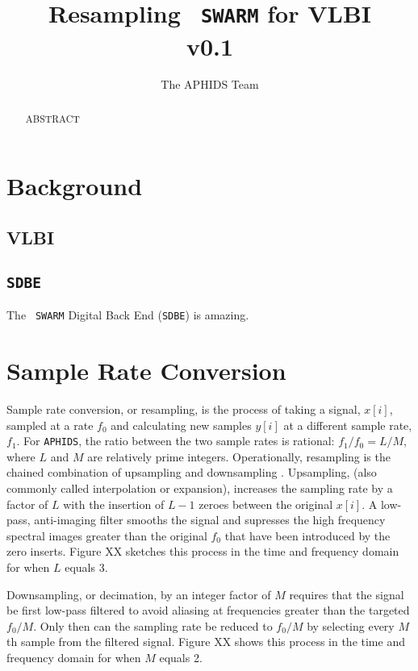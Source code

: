 \documentclass[11pt,preprint]{aastex}
\newcommand{\SWARM}[1]{\texttt{#1\,SWARM}}
\newcommand{\SDBE}{\texttt{SDBE}}
\newcommand{\APHIDS}{\texttt{APHIDS}}
\begin{document}
\title{Resampling \SWARM{} for VLBI \\ v0.1}

\author{The APHIDS Team}

\begin{abstract}
ABSTRACT
\end{abstract}

\section{Background} \label{sec:background}
\subsection{VLBI}

\subsection{\SDBE}
The \SWARM{} Digital Back End (\SDBE) is amazing.

\section{Sample Rate Conversion} \label{sec:src_basics}

Sample rate conversion, or resampling, is the process of taking a signal, $x[i]$, sampled at a rate $f_0$ and 
calculating new samples $y[i]$ at a different sample rate, $f_1$.  For \APHIDS, the ratio between the two 
sample rates is rational: $f_1/f_0 = L/M$, where $L$ and $M$ are relatively prime integers.  Operationally, 
resampling is the 
chained combination of upsampling and downsampling \citep{oppenheim10,lyons11}.  Upsampling, (also commonly 
called interpolation or expansion), 
increases the sampling rate 
by a factor of $L$ with the insertion of $L-1$ zeroes between the original $x[i]$.  A low-pass, 
anti-imaging filter smooths the signal and supresses the high frequency spectral images greater than the original 
$f_0$ that have been introduced by the zero inserts.  Figure XX sketches this process in the time and frequency 
domain for when $L$ equals 3. 

Downsampling, or decimation, by an integer factor of $M$ requires that the signal be first low-pass filtered to 
avoid aliasing 
at frequencies greater than the targeted $f_0/M$.  Only then can the sampling rate be reduced to $f_0/M$ by 
selecting every $M$th sample from the filtered signal.  Figure XX shows this process in the time and frequency 
domain for when $M$ equals 2.
\end{document}
